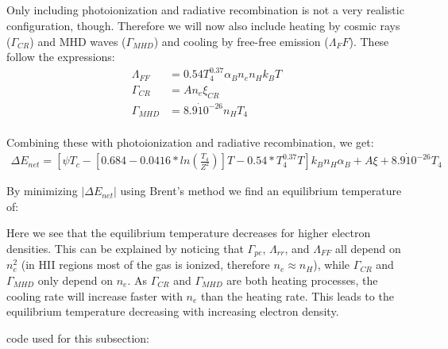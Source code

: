 \subsection{}
Only including photoionization and radiative recombination is not a very realistic configuration, though.
Therefore we will now also include heating by cosmic rays ($\Gamma_{CR}$) and MHD waves ($\Gamma_{MHD}$) and cooling by free-free emission ($\Lambda_FF$).
These follow the expressions:
\begin{align} 
    \Lambda_{FF} &= 0.54 T^{0.37}_4 \alpha_B n_e n_H k_B T \\
    \Gamma_{CR} &= A n_e \xi_{CR} \\
    \Gamma_{MHD} &= 8.9\dot10^{-26} n_H T_4\\
\end{align}

Combining these with photoionization and radiative recombination, we get:
\begin{align}
    \Delta E_{net} = \left[ \psi T_c - \left[ 0.684 - 0.0416 * ln\left( \frac{T_4}{Z^2} \right)\right] T - 0.54 * T_4^{0.37} T\right] k_B n_H \alpha_B + A \xi + 8.9\dot10^{-26} T_4
\end{align}

By minimizing $| \Delta E_{net} |$ using Brent's method we find an equilibrium temperature of:


Here we see that the equilibrium temperature decreases for higher electron densities.
This can be explained by noticing that $\Gamma_{pe}$, $\Lambda_{rr}$, and $\Lambda_{FF}$ all depend on $n_e^2$ 
(in HII regions most of the gas is ionized, therefore $n_e \approx n_H$), while $\Gamma_{CR}$ and $\Gamma_{MHD}$ only depend on $n_e$.
As $\Gamma_{CR}$ and $\Gamma_{MHD}$ are both heating processes, the cooling rate will increase faster with $n_e$ than the heating rate.
This leads to the equilibrium temperature decreasing with increasing electron density.

code used for this subsection:
